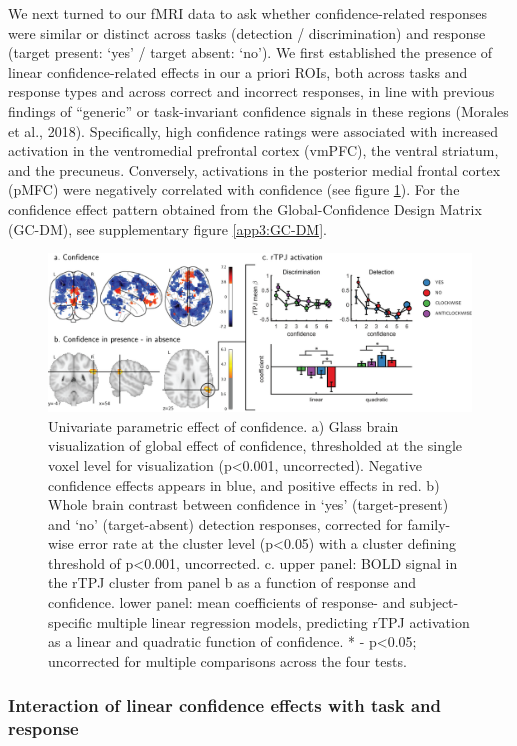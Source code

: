 \documentclass[12pt,twoside]{reedthesis}
\begin{document}
We next turned to our fMRI data to ask whether confidence-related responses were similar or distinct across tasks (detection / discrimination) and response (target present: `yes' / target absent: `no'). We first established the presence of linear confidence-related effects in our a priori ROIs, both across tasks and response types and across correct and incorrect responses, in line with previous findings of ``generic'' or task-invariant confidence signals in these regions (Morales et al., 2018). Specifically, high confidence ratings were associated with increased activation in the ventromedial prefrontal cortex (vmPFC), the ventral striatum, and the precuneus. Conversely, activations in the posterior medial frontal cortex (pMFC) were negatively correlated with confidence (see figure \ref{fig:fMRI-exp1-globalConf}). For the confidence effect pattern obtained from the Global-Confidence Design Matrix (GC-DM), see supplementary figure \ref{app3:GC-DM}.
\begin{figure}
\includegraphics[width=\linewidth]{figure/fMRI/figure3} \caption[Univariate parametric effect of confidence]{Univariate parametric effect of confidence. a) Glass brain visualization of global effect of confidence, thresholded at the single voxel level for visualization (p<0.001, uncorrected). Negative confidence effects appears in blue, and positive effects in red. b) Whole brain contrast between confidence in ‘yes’ (target-present) and ‘no’ (target-absent) detection responses, corrected for family-wise error rate at the cluster level (p<0.05) with a cluster defining threshold of p<0.001, uncorrected. c. upper panel: BOLD signal in the rTPJ cluster from panel b as a function of response and confidence. lower panel: mean coefficients of response- and subject-specific multiple linear regression models, predicting rTPJ activation as a linear and quadratic function of confidence.  * - p<0.05; uncorrected for multiple comparisons across the four tests.}\label{fig:fMRI-exp1-globalConf}
\end{figure}
\hypertarget{interaction-of-linear-confidence-effects-with-task-and-response}{%
\subsubsection*{Interaction of linear confidence effects with task and response}\label{interaction-of-linear-confidence-effects-with-task-and-response}}
\end{document}
